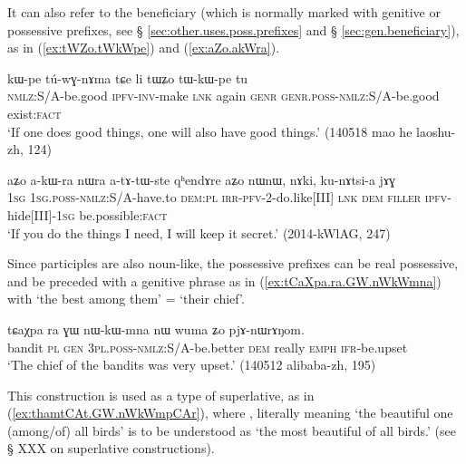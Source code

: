 It can also refer to the beneficiary (which is normally marked with genitive or possessive prefixes, see § \ref{sec:other.uses.poss.prefixes} and § \ref{sec:gen.beneficiary}), as in (\ref{ex:tWZo.tWkWpe}) and (\ref{ex:aZo.akWra}).

 \begin{exe} 
\ex \label{ex:tWZo.tWkWpe}
\gll  kɯ-pe tú-wɣ-nɤma tɕe li tɯʑo tɯ-kɯ-pe tu \\
\textsc{nmlz}:S/A-be.good \textsc{ipfv}-\textsc{inv}-make \textsc{lnk} again \textsc{genr} \textsc{genr}.\textsc{poss}-\textsc{nmlz}:S/A-be.good exist:\textsc{fact} \\
\glt  `If one does good things, one will also have good things.' (140518 mao he laoshu-zh, 124)
\end{exe}

 \begin{exe} 
\ex \label{ex:aZo.akWra}
\gll  aʑo a-kɯ-ra nɯra a-tɤ-tɯ-ste qʰendɤre aʑo nɯnɯ, nɤki, ku-nɤtsi-a jɤɣ \\
\textsc{1sg} \textsc{1sg}.\textsc{poss}-\textsc{nmlz}:S/A-have.to \textsc{dem}:\textsc{pl} \textsc{irr}-\textsc{pfv}-2-do.like[III] \textsc{lnk} \textsc{dem} \textsc{filler} \textsc{ipfv}-hide[III]-\textsc{1sg} be.possible:\textsc{fact}  \\
\glt  `If you do the things I need, I will keep it secret.'  (2014-kWlAG, 247)
\end{exe}

Since participles are also noun-like, the possessive prefixes can be real possessive, and be preceded with a genitive phrase as in (\ref{ex:tCaXpa.ra.GW.nWkWmna}) with  `the best among them' = `their chief'.

 \begin{exe} 
\ex \label{ex:tCaXpa.ra.GW.nWkWmna}
\gll tɕaχpa ra ɣɯ nɯ-kɯ-mna nɯ wuma ʑo pjɤ-nɯrɤŋom. \\
bandit \textsc{pl} \textsc{gen} \textsc{3pl}.\textsc{poss}-\textsc{nmlz}:S/A-be.better \textsc{dem} really \textsc{emph} \textsc{ifr}-be.upset \\
\glt `The chief of the bandits was very upset.' (140512 alibaba-zh, 195)
\end{exe}

This construction is used as a type of superlative, as in (\ref{ex:thamtCAt.GW.nWkWmpCAr}), where , literally meaning `the beautiful one (among/of) all birds' is to be understood as `the most beautiful of all birds.' (see § XXX on superlative constructions).

